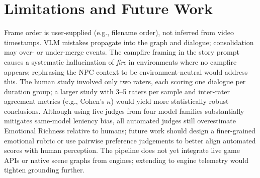 \documentclass{article}
\begin{document}
\section{Limitations and Future Work}

Frame order is user-supplied (e.g., filename order), not inferred from video timestamps. VLM mistakes propagate into the graph and dialogue; consolidation may over- or under-merge events. The campfire framing in the story prompt causes a systematic hallucination of \emph{fire} in environments where no campfire appears; rephrasing the NPC context to be environment-neutral would address this. The human study involved only two raters, each scoring one dialogue per duration group; a larger study with 3--5 raters per sample and inter-rater agreement metrics (e.g., Cohen's $\kappa$) would yield more statistically robust conclusions. Although using five judges from four model families substantially mitigates same-model leniency bias, all automated judges still overestimate Emotional Richness relative to humans; future work should design a finer-grained emotional rubric or use pairwise preference judgements to better align automated scores with human perception. The pipeline does not yet integrate live game APIs or native scene graphs from engines; extending to engine telemetry would tighten grounding further.




%



\end{document}
